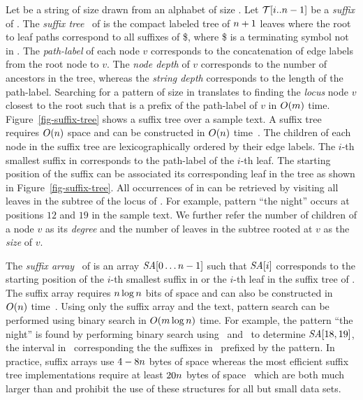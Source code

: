 Let {\col} be a string of size {\collen} drawn from an alphabet {\alphabet} of
size {\alphabetsize}. Let {$\mathcal{T}[i..n-1]$} be a {\it suffix} of {\col}.
The {\it suffix tree}~\cite{w-swat73} of {\col} is the compact labeled
tree of $n+1$ leaves where the root to leaf paths correspond to all suffixes of {\col\$},
where \$ is a terminating symbol not in {\alphabet}. The {\it path-label}
of each node $v$ corresponds to the concatenation of edge labels from the
root node to $v$. The {\it node depth} of $v$ corresponds to the number
of ancestors in the tree, whereas the {\it string depth} corresponds to the
length of the path-label. Searching for a pattern {\pattern} of 
size {\plen} in {\col} translates to finding the {\it locus} node $v$ closest to
the root such that {\pattern} is a prefix of the path-label of $v$ in $O(m)$ time.
Figure~\ref{fig-suffix-tree} shows a suffix tree over a sample text. 
A suffix tree requires $O(n)$ space 
and can be constructed in $O(n)$ time~\cite{u-algo95}. The children
of each node in the suffix tree are lexicographically ordered by their edge labels.
The $i$-th smallest suffix in {\col} corresponds to the path-label of the $i$-th 
leaf. The starting position of the suffix can be associated its corresponding
leaf in the tree as shown in Figure~\ref{fig-suffix-tree}. All 
occurrences of {\pattern} in {\col} can be retrieved by visiting all leaves
in the subtree of the locus of {\pattern}. For example, pattern ``the night'' occurs
at positions $12$ and $19$ in the sample text. We further refer the number of children
of a node $v$ as its {\it degree} and the number of leaves in the subtree rooted at $v$
as the {\it size} of $v$.

The {\it suffix array}~\cite{mm-jcomp93} of {\col} is an array $\mbox{\emph{SA}}[0\ldots n-1]$ such
that $\mbox{\emph{SA}}[i]$ corresponds to the starting position of the $i$-th smallest suffix
in {\col} or the $i$-th leaf in the suffix tree of {\col}. The suffix array requires
$n \log n$ bits of space and can also be constructed in $O(n)$ time~\cite{ksb-jacm06}.
Using only the suffix array and the text, pattern search can be performed using binary search
in $O(m \log n)$ time. For example, the pattern ``the night'' is found by performing
binary search using \SA\ and \col\ to determine $\mbox{\emph{SA}}[18,19]$, the interval in 
\SA\ corresponding the the suffixes in \col\ prefixed by the pattern.
In practice, suffix arrays use $4-8n$ bytes of space whereas the most efficient
suffix tree implementations require at least $20n$ bytes of space~\cite{k-spe99} which
are both much larger than {\col} and prohibit the use of these structures for all but
small data sets.

